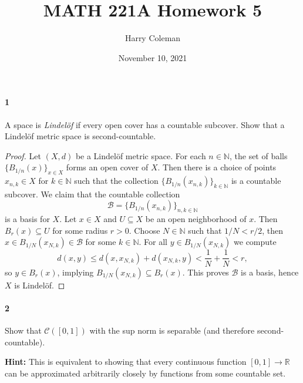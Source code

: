 \documentclass[12pt]{article}
\renewcommand{\maketitle}{\thispagestyle{title}}
\newlength{\myparskip}
\newenvironment{fullbox}{\begin{lrbox}{\savefullbox}\begin{minipage}{\dimexpr\textwidth-2\fboxsep\relax}\setlength{\parskip}{\myparskip}}{\end{minipage}\end{lrbox}\framebox[\textwidth]{\usebox{\savefullbox}}}
\newenvironment{pbox}[1][]{\begin{fullbox}\ifx#1\empty\else\paragraph{#1}\fi}{\end{fullbox}}
\newcommand{\N}{\mathbb{N}}
\newcommand{\<}{\langle}
\renewcommand{\>}{\rangle}
\theoremstyle{definition}
\begin{document}
\title{MATH 221A Homework 5}
\author{Harry Coleman}
\date{November 10, 2021}
\maketitle

\begin{pbox}[1]
    A space is \emph{Lindel\"of} if every open cover has a countable subcover. Show that a Lindel\"of metric space is second-countable.
\end{pbox}

\begin{proof}
    Let $(X, d)$ be a Lindel\"of metric space.
    For each $n \in \N$, the set of balls $\{B_{1/n}(x)\}_{x \in X}$ forms an open cover of $X$.
    Then there is a choice of points $x_{n,k} \in X$ for $k \in \N$ such that the collection $\{B_{1/n}(x_{n, k})\}_{k \in \N}$ is a countable subcover.
    We claim that the countable collection
    \[
        \mathcal{B} = \{B_{1/n}(x_{n, k})\}_{n, k \in \N}
    \]
    is a basis for $X$.
    Let $x \in X$ and $U \subseteq X$ be an open neighborhood of $x$.
    Then $B_r(x) \subseteq U$ for some radius $r > 0$.
    Choose $N \in \N$ such that $1/N < r/2$, then $x \in B_{1/N}(x_{N, k}) \in \mathcal{B}$ for some $k \in \N$.
    For all $y \in B_{1/N}(x_{N,k})$ we compute
    \[
        d(x, y)
            \leq d(x, x_{N, k}) + d(x_{N, k}, y) 
            < \frac{1}{N} + \frac{1}{N}
            < r,
    \]
    so $y \in B_r(x)$, implying $B_{1/N}(x_{N, k}) \subseteq B_r(x)$.
    This proves $\mathcal{B}$ is a basis, hence $X$ is Lindel\"of.
\end{proof}



\newpage
\begin{pbox}[2]
    Show that $\mathcal C([0,1])$ with the sup norm is separable (and therefore second-countable).

    \textbf{Hint:} This is equivalent to showing that every continuous function $[0,1] \to \mathbb R$ can be approximated arbitrarily closely by functions from some countable set.
\end{pbox}
\end{document}
